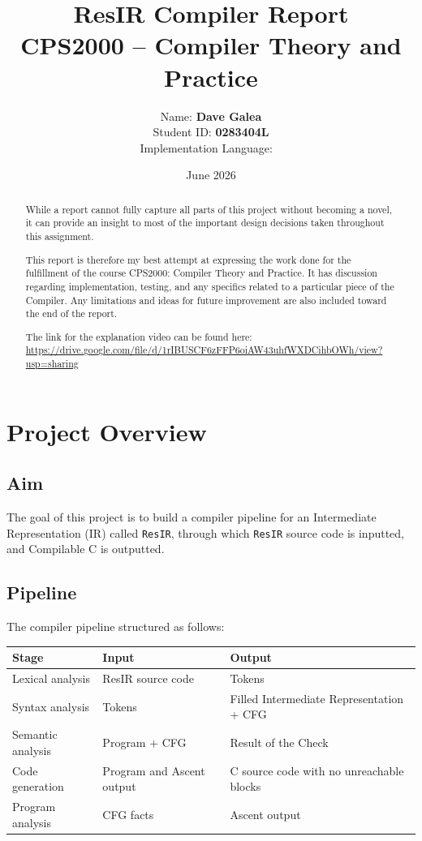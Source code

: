 \documentclass[11pt,a4paper,oneside]{report}
\title{
	\vspace{-1cm}
	\Huge\textbf{ResIR Compiler Report}\\
	\vspace{0.3cm}
	\Large CPS2000 -- Compiler Theory and Practice
}
\author{
	Name: \textbf{Dave Galea}\\
	Student ID: \textbf{0283404L}\\
	Implementation Language: \rustlogo\
}
\date{June 2026}
\begin{document}
	
	\maketitle
	
	\begin{abstract}
		While a report cannot fully capture all parts of this project without becoming a novel, it can provide an insight to most of the important design decisions taken throughout this assignment.
		
		This report is therefore my best attempt at expressing the work done for the fulfillment of the course CPS2000: Compiler Theory and Practice. It has discussion regarding implementation, testing, and any specifics related to a particular piece of the Compiler. Any limitations and ideas for future improvement are also included toward the end of the report. 
		
		The link for the explanation video can be found here: \url{https://drive.google.com/file/d/1rIBUSCF6zFFP6oiAW43uhfWXDCihbOWh/view?usp=sharing} 
	\end{abstract}
	
	\tableofcontents
	\newpage
	
	\chapter{Project Overview}
	
	\section{Aim}
	The goal of this project is to build a compiler pipeline for an Intermediate Representation (IR) called \texttt{ResIR}, through which \texttt{ResIR} source code is inputted, and Compilable C is outputted. 
	
	\section{Pipeline}
	The compiler pipeline structured as follows:
	
	\begin{center}
		\begin{tabular}{lll}
			\toprule
			Stage & Input & Output \\
			\midrule
			Lexical analysis & ResIR source code & Tokens \\
			Syntax analysis & Tokens & Filled Intermediate Representation + CFG \\
			Semantic analysis & Program + CFG & Result of the Check  \\
			Code generation & Program and Ascent output & C source code with no unreachable blocks \\
			Program analysis & CFG facts & Ascent output \\
			\bottomrule
		\end{tabular}
	\end{center}
\end{document}
